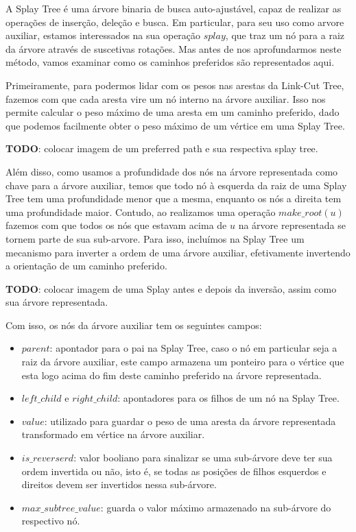 A Splay Tree é uma árvore binaria de busca auto-ajustável, capaz de realizar as operações de inserção, deleção e busca. Em particular, para seu uso como arvore auxiliar, estamos interessados na sua operação $splay$, que traz um nó para a raiz da árvore através de suscetivas rotações. Mas antes de nos aprofundarmos neste método, vamos examinar como os caminhos preferidos são representados aqui.

Primeiramente, para podermos lidar com os pesos nas arestas da Link-Cut Tree, fazemos com que cada aresta vire um nó interno na árvore auxiliar. Isso nos permite calcular o peso máximo de uma aresta em um caminho preferido, dado que podemos facilmente obter o peso máximo de um vértice em uma Splay Tree.

\begin{center}
    \textbf{TODO}: colocar imagem de um preferred path e sua respectiva splay tree.
\end{center}

Além disso, como usamos a profundidade dos nós na árvore representada como chave para a árvore auxiliar, temos que todo nó à esquerda da raiz de uma Splay Tree tem uma profundidade menor que a mesma, enquanto os nós a direita tem uma profundidade maior. Contudo, ao realizamos uma operação $make\_root(u)$ fazemos com que todos os nós que estavam acima de $u$ na árvore representada se tornem parte de sua sub-arvore. Para isso, incluímos na Splay Tree um mecanismo para inverter a ordem de uma árvore auxiliar, efetivamente invertendo a orientação de um caminho preferido.

\begin{center}
    \textbf{TODO}: colocar imagem de uma Splay antes e depois da inversão, assim como sua árvore representada.
\end{center}

Com isso, os nós da árvore auxiliar tem os seguintes campos:

\begin{itemize}
    \item $parent$: apontador para o pai na Splay Tree, caso o nó em particular seja a raiz da árvore auxiliar, este campo armazena um ponteiro para o vértice que esta logo acima do fim deste caminho preferido na árvore representada.
    \item $left\_child$ e $right\_child$: apontadores para os filhos de um nó na Splay Tree.
    \item $value$: utilizado para guardar o peso de uma aresta da árvore representada transformado em vértice na árvore auxiliar.
    \item $is\_reverserd$: valor booliano para sinalizar se uma sub-árvore deve ter sua ordem invertida ou não, isto é, se todas as posições de filhos esquerdos e direitos devem ser invertidos nessa  sub-árvore.
    \item $max\_subtree\_value$: guarda o valor máximo armazenado na  sub-árvore do respectivo nó.
\end{itemize}

